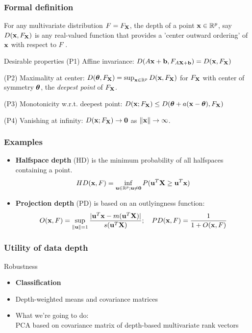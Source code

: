 \documentclass[handout,10pt]{beamer}
\begin{document}
\begin{frame}
\frametitle{Formal definition}
For any multivariate distribution $F = F_{\mathbf{X}}$, the depth of a point ${\bf{x}} \in \mathbb{R}^p$, say $D({\bf{x}}, F_{\mathbf{X}})$ is any real-valued function that provides a 'center outward ordering' of ${\bf{x}}$ with respect to $F$ \citep{zuo00}.

\vspace{.5cm}
\begin{block}{Desirable properties \citep{liu90}}
(P1) {\colbit Affine invariance}: $D(A{\bf{x}} + {\bf{b}}, F_{A{\mathbf{X}}+{\bf{b}}}) = D({\bf{x}}, F_{\mathbf{X}})$
\vspace{.2cm}

(P2) {\colbit Maximality at center}: $D({\boldsymbol{\theta}}, F_{\mathbf{X}}) = \sup_{{\bf{x}}\in \mathbb{R}^p} D({\bf{x}}, F_{\mathbf{X}})$ for $F_{\mathbf{X}}$ with center of symmetry ${\boldsymbol{\theta}}$, the \textit{deepest point} of $F_{\mathbf{X}}$.
\vspace{.2cm}

(P3) {\colbit Monotonicity w.r.t. deepest point}: $D({\bf{x}}; F_{\mathbf{X}}) \leq D({\boldsymbol{\theta}} + a({\bf{x}} - {\boldsymbol{\theta}}), F_{\mathbf{X}})$
\vspace{.5cm}

(P4) {\colbit Vanishing at infinity}: $D({\bf{x}}; F_{\mathbf{X}}) \rightarrow \bf0$ as $\|{\bf{x}}\| \rightarrow \infty $.
\end{block}

\end{frame}

\begin{frame}
\frametitle{Examples}
\begin{itemize}
\item \textbf{Halfspace depth} (HD) \citep{tukey75} is the minimum probability of all halfspaces containing a point.
$$ HD({\bf{x}}, F)  = \inf_{{\bf{u}} \in \mathbb{R}^p; {\bf{u}} \neq \bf0} P({\bf{u}}^T {\mathbf{X}} \geq {\bf{u}}^T {\bf{x}}) $$

\item \textbf{Projection depth} (PD) \citep{zuo03} is based on an outlyingness function:
$$ O({\bf{x}}, F) = \sup_{\| {\bf{u}} \| = 1} \frac{| {\bf{u}}^T{\bf{x}} - m({\bf{u}}^T{\mathbf{X}})|}{s({\bf{u}}^T{\mathbf{X}})}; \quad PD({\bf{x}}, F) = \frac{1}{1+O({\bf{x}}, F)} $$
\end{itemize}
\end{frame}

\begin{frame}
\frametitle{Utility of data depth}
{\colbbf Robustness}

\begin{itemize}
\item \textbf{Classification}
\vspace{.2cm}

\item Depth-weighted means and covariance matrices
\vspace{.2cm}

\item What we're going to do:\\PCA based on covariance matrix of depth-based multivariate rank vectors
\end{itemize}
\end{frame}
\end{document}

